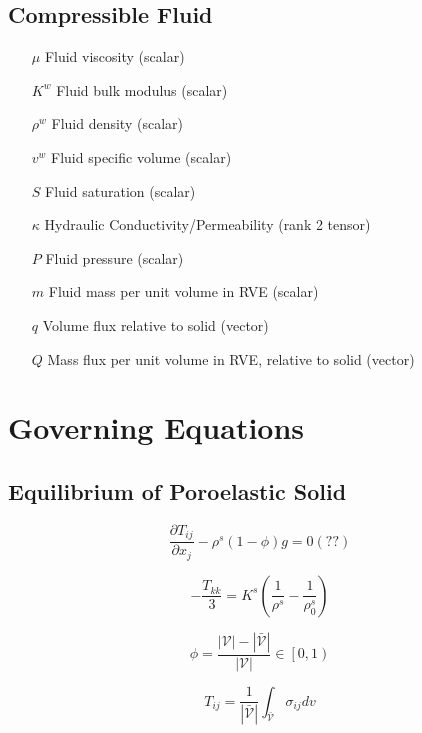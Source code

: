 \documentclass[11pt]{article} %
\begin{document}
\subsection{Compressible Fluid}

\begin{itemize}
	\item[$\mu$] Fluid viscosity (scalar)
	\item[$K^w$] Fluid bulk modulus (scalar)
	\item[$\rho^w$] Fluid density (scalar)
	\item[$v^w$] Fluid specific volume (scalar)
	\item[$S$] Fluid saturation (scalar)
	\item[$\kappa$] Hydraulic Conductivity/Permeability (rank 2 tensor)
	\item[$P$] Fluid pressure (scalar)
	\item[$m$] Fluid mass per unit volume in RVE (scalar)
	\item[$q$] Volume flux relative to solid (vector)
	\item[$Q$] Mass flux per unit volume in RVE, relative to solid (vector)
\end{itemize}

\section{Governing Equations}

\subsection{Equilibrium of Poroelastic Solid}

\begin{equation}
	\frac{\partial T_{ij}}{\partial x_j} - \rho^s \left( 1 - \phi \right) g = 0(??)
\end{equation}

\begin{equation}
	-\frac{T_{kk}}{3} =  K^s \left( \frac{1}{\rho^s} - \frac{1}{\rho^s_0} \right)
\end{equation}

\begin{equation}
	\phi = \frac{|\mathcal{V}| -  |\bar{\mathcal{V}}|}{|\mathcal{V}|} \in \left[ 0, 1 \right)
\end{equation}

\begin{equation}
	T_{ij} = \frac{1}{|\bar{\mathcal{V}}|} \int_{\bar{\mathcal{V}}} \sigma_{ij} dv
\end{equation}
\end{document}
